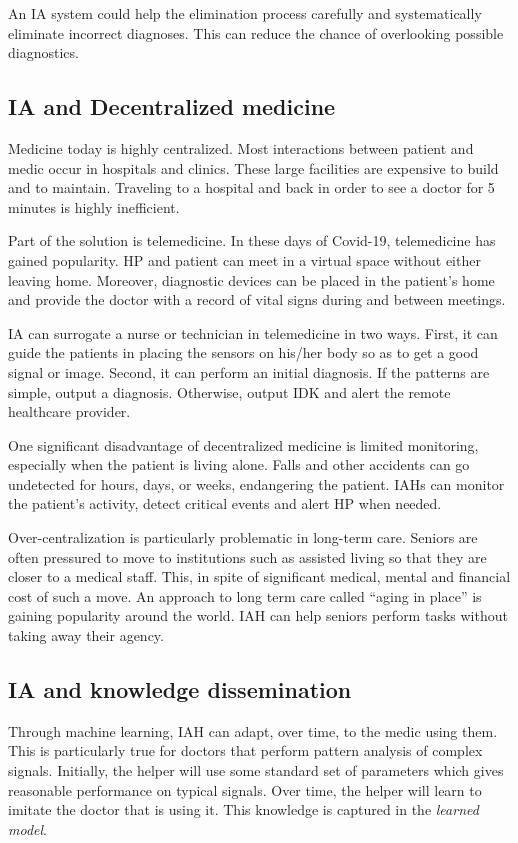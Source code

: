 \documentclass[11pt]{pnas-new}
\begin{document}
An IA system could help the elimination process carefully and
systematically eliminate incorrect diagnoses. This can reduce the chance of overlooking possible diagnostics.

\subsection{IA and Decentralized medicine}

Medicine today is highly centralized. Most interactions
between patient and medic occur in hospitals and clinics. These
large facilities are expensive to build and to maintain. Traveling to
a hospital and back in order to see a doctor for 5 minutes is highly
inefficient. 

Part of the solution is telemedicine. In these days of Covid-19,
telemedicine has gained popularity. HP and patient can meet in a
virtual space without either leaving home. Moreover, diagnostic
devices can be placed in the patient's home and provide the doctor with
{a record of vital signs during and between meetings.}


IA can surrogate a nurse or technician in telemedicine in two ways. First,
it can guide the patients in placing the sensors on his/her
body so as to get a good signal or image. Second, it can perform an
initial diagnosis. If the patterns are simple, output a diagnosis.
Otherwise, output IDK and alert the remote healthcare provider. 

One significant disadvantage of decentralized medicine is {limited} monitoring, especially when the patient is living alone. 
Falls and other accidents can go undetected for hours, days, or weeks, endangering the patient. IAHs can monitor the patient's activity, detect critical events and alert HP when needed.

Over-centralization is particularly problematic in long-term care.
Seniors are often pressured to move to institutions such as
assisted living so that they are closer to a medical staff. This, in
spite of significant medical, mental and financial cost of such a
move. An approach to long term care called ``aging in
place'' is gaining popularity around the world. IAH can help
seniors perform tasks without taking away their agency.


\subsection{IA and knowledge dissemination}

Through machine learning, IAH can adapt, over time, to the
medic using them. This is particularly true for  doctors that
perform pattern analysis of complex signals. Initially, the helper will
use some standard set of parameters which gives reasonable performance on
typical signals. Over time, the helper will learn to imitate the
doctor that is using it. This knowledge is captured in the  {\em learned model}.
\end{document}
